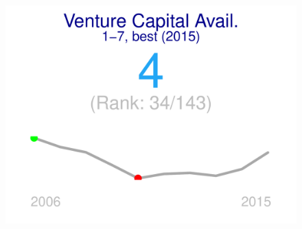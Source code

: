 \documentclass{article}\usepackage[]{graphicx}\usepackage[]{color}
\makeatletter
\def\maxwidth{ %
  \ifdim\Gin@nat@width>\linewidth
    \linewidth
  \else
    \Gin@nat@width
  \fi
}
\makeatother
\begin{document}
\begin{figure}
\begin{minipage}[t]{0.99\textwidth}
\begin{minipage}[t]{0.55\textwidth}
\begin{minipage}[c]{0.30\textwidth}
    \end{minipage}
    \begin{minipage}[c]{0.30\textwidth}


{\centering \includegraphics[width=\maxwidth]{figure/figure_sparkline6-1} 

}



    \end{minipage}
  \end{minipage}
\end{minipage}
\end{figure}

\end{document}
